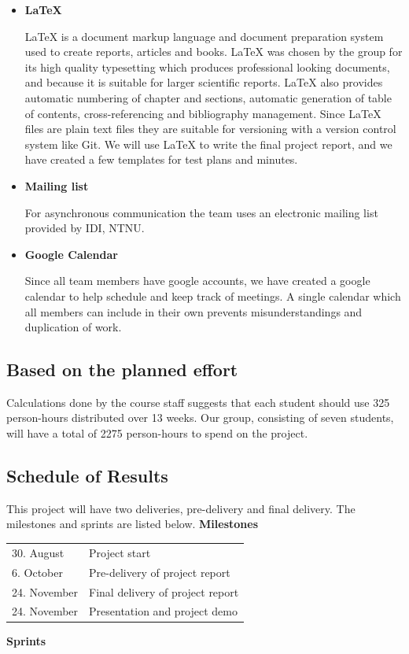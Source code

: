 \begin{itemize}
\item \textbf{LaTeX}

LaTeX is a document markup language and document preparation system used to create reports, articles and books. LaTeX was chosen by the group for its high quality typesetting which produces professional looking documents, and because it is suitable for larger scientific reports. LaTeX also provides automatic numbering of chapter and sections, automatic generation of table of contents, cross-referencing and bibliography management. Since LaTeX files are plain text files they are suitable for versioning with a version control system like Git. We will use LaTeX to write the final project report, and we have created a few templates for test plans and minutes.

\item \textbf{Mailing list}

For asynchronous communication the team uses an electronic mailing list provided by IDI, NTNU.

\item \textbf{Google Calendar}

Since all team members have google accounts, we have created a google calendar to help schedule and keep track of meetings. A single calendar which all members can include in their own prevents misunderstandings and duplication of work.

\end{itemize}

\subsection{Based on the planned effort}
Calculations done by the course staff suggests that each student should use 325 person-hours distributed over 13 weeks. Our group, consisting of seven students, will have a total of 2275 person-hours to spend on the project. 

\subsection{Schedule of Results}
This project will have two deliveries, pre-delivery and final delivery.  The milestones and sprints are listed below. \newline
\textbf{Milestones}

\begin{tabular}{l  l}
	30. August & Project start \\
	6. October & Pre-delivery of project report \\
	24. November & Final delivery of project report \\
	24. November & Presentation and project demo \\
\end{tabular}
\newline
\textbf{Sprints}

